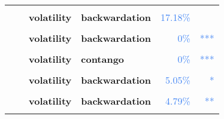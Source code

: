 \documentclass[
  authoryear,
  preprint,
  3p]{elsarticle}
\begin{document}
\begin{longtable}[t]{>{}l>{}l>{}l>{}l>{}r>{}r}
\textbf{\cellcolor{gray!10}{Soybeans (XCBT)}} & \textbf{\cellcolor{gray!10}{past}} & \textbf{\cellcolor{gray!10}{mean}} & \textbf{\cellcolor{gray!10}{backwardation}} & \textcolor[HTML]{4285f4}{\cellcolor{gray!10}{48.92\%}} & \textcolor[HTML]{4285f4}{\cellcolor{gray!10}{}}\\
\textbf{} & \textbf{} & \textbf{volatility} & \textbf{backwardation} & \textcolor[HTML]{4285f4}{17.18\%} & \textcolor[HTML]{4285f4}{}\\
\textbf{\cellcolor{gray!10}{}} & \textbf{\cellcolor{gray!10}{financialisation}} & \textbf{\cellcolor{gray!10}{mean}} & \textbf{\cellcolor{gray!10}{contango}} & \textcolor[HTML]{4285f4}{\cellcolor{gray!10}{38.74\%}} & \textcolor[HTML]{4285f4}{\cellcolor{gray!10}{}}\\
\addlinespace
\textbf{} & \textbf{} & \textbf{volatility} & \textbf{backwardation} & \textcolor[HTML]{4285f4}{0\%} & \textcolor[HTML]{4285f4}{\vphantom{7} ***}\\
\textbf{\cellcolor{gray!10}{}} & \textbf{\cellcolor{gray!10}{crisis}} & \textbf{\cellcolor{gray!10}{mean}} & \textbf{\cellcolor{gray!10}{backwardation}} & \textcolor[HTML]{4285f4}{\cellcolor{gray!10}{57.61\%}} & \textcolor[HTML]{4285f4}{\cellcolor{gray!10}{}}\\
\textbf{} & \textbf{} & \textbf{volatility} & \textbf{contango} & \textcolor[HTML]{4285f4}{0\%} & \textcolor[HTML]{4285f4}{\vphantom{29} ***}\\
\textbf{\cellcolor{gray!10}{}} & \textbf{\cellcolor{gray!10}{post-crisis}} & \textbf{\cellcolor{gray!10}{mean}} & \textbf{\cellcolor{gray!10}{contango}} & \textcolor[HTML]{4285f4}{\cellcolor{gray!10}{37.95\%}} & \textcolor[HTML]{4285f4}{\cellcolor{gray!10}{}}\\
\textbf{} & \textbf{} & \textbf{volatility} & \textbf{backwardation} & \textcolor[HTML]{4285f4}{5.05\%} & \textcolor[HTML]{4285f4}{*}\\
\addlinespace
\textbf{\cellcolor{gray!10}{Wheat-SRW (XCBT)}} & \textbf{\cellcolor{gray!10}{past}} & \textbf{\cellcolor{gray!10}{mean}} & \textbf{\cellcolor{gray!10}{contango}} & \textcolor[HTML]{4285f4}{\cellcolor{gray!10}{44.86\%}} & \textcolor[HTML]{4285f4}{\cellcolor{gray!10}{}}\\
\textbf{} & \textbf{} & \textbf{volatility} & \textbf{backwardation} & \textcolor[HTML]{4285f4}{4.79\%} & \textcolor[HTML]{4285f4}{**}\\
\textbf{\cellcolor{gray!10}{}} & \textbf{\cellcolor{gray!10}{financialisation}} & \textbf{\cellcolor{gray!10}{mean}} & \textbf{\cellcolor{gray!10}{backwardation}} & \textcolor[HTML]{4285f4}{\cellcolor{gray!10}{83.21\%}} & \textcolor[HTML]{4285f4}{\cellcolor{gray!10}{}}\\

\end{longtable}
\end{document}
